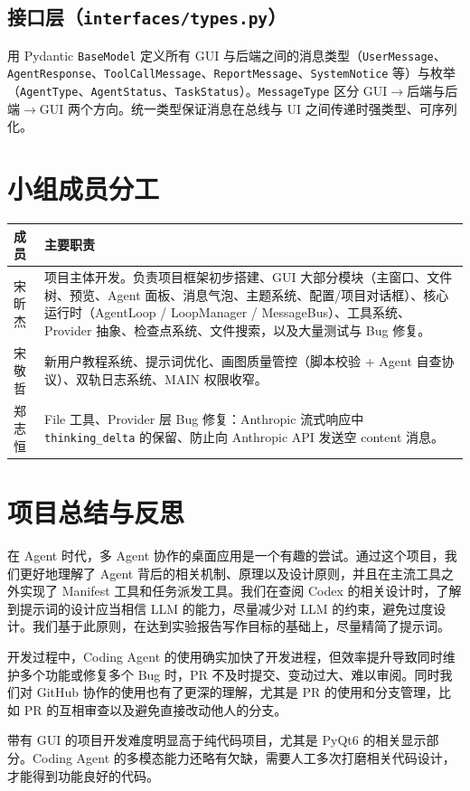 \documentclass[a4paper,11pt]{article}
\begin{document}
\subsection{接口层（\texttt{interfaces/types.py}）}

用 Pydantic \texttt{BaseModel} 定义所有 GUI 与后端之间的消息类型（\texttt{UserMessage}、\texttt{AgentResponse}、\texttt{ToolCallMessage}、\texttt{ReportMessage}、\texttt{SystemNotice} 等）与枚举（\texttt{AgentType}、\texttt{AgentStatus}、\texttt{TaskStatus}）。\texttt{MessageType} 区分 GUI$\rightarrow$后端与后端$\rightarrow$GUI 两个方向。统一类型保证消息在总线与 UI 之间传递时强类型、可序列化。

\section{小组成员分工}

\begin{table}[H]
\centering
\renewcommand{\arraystretch}{1.35}
\begin{tabularx}{\textwidth}{@{}p{2.2cm}X@{}}
\toprule
\textbf{成员} & \textbf{主要职责} \\
\midrule
宋昕杰 & 项目主体开发。负责项目框架初步搭建、GUI 大部分模块（主窗口、文件树、预览、Agent 面板、消息气泡、主题系统、配置/项目对话框）、核心运行时（AgentLoop / LoopManager / MessageBus）、工具系统、Provider 抽象、检查点系统、文件搜索，以及大量测试与 Bug 修复。 \\
宋敬哲 & 新用户教程系统、提示词优化、画图质量管控（脚本校验 + Agent 自查协议）、双轨日志系统、MAIN 权限收窄。 \\
郑志恒 & File 工具、Provider 层 Bug 修复：Anthropic 流式响应中 \texttt{thinking\_delta} 的保留、防止向 Anthropic API 发送空 content 消息。 \\
\bottomrule
\end{tabularx}
\end{table}

\section{项目总结与反思}

在 Agent 时代，多 Agent 协作的桌面应用是一个有趣的尝试。通过这个项目，我们更好地理解了 Agent 背后的相关机制、原理以及设计原则，并且在主流工具之外实现了 Manifest 工具和任务派发工具。我们在查阅 Codex\cite{codex} 的相关设计时，了解到提示词的设计应当相信 LLM 的能力，尽量减少对 LLM 的约束，避免过度设计。我们基于此原则，在达到实验报告写作目标的基础上，尽量精简了提示词。

开发过程中，Coding Agent 的使用确实加快了开发进程，但效率提升导致同时维护多个功能或修复多个 Bug 时，PR 不及时提交、变动过大、难以审阅。同时我们对 GitHub 协作的使用也有了更深的理解，尤其是 PR 的使用和分支管理，比如 PR 的互相审查以及避免直接改动他人的分支。

带有 GUI 的项目开发难度明显高于纯代码项目，尤其是 PyQt6 的相关显示部分。Coding Agent 的多模态能力还略有欠缺，需要人工多次打磨相关代码设计，才能得到功能良好的代码。



\end{document}
